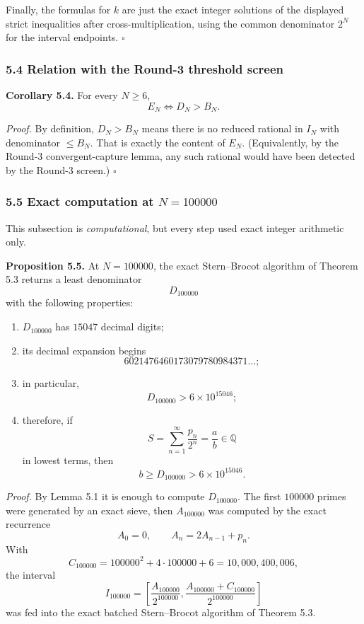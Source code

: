 Finally, the formulas for $k$ are just the exact integer solutions of the displayed strict inequalities after cross-multiplication, using the common denominator $2^N$ for the interval endpoints. \hfill$\square$

\subsubsection*{5.4 Relation with the Round-3 threshold screen}

\textbf{Corollary 5.4.}
For every $N\ge 6$,
\[
E_N \Longleftrightarrow D_N>B_N.
\]

\emph{Proof.}
By definition, $D_N>B_N$ means there is no reduced rational in $I_N$ with denominator $\le B_N$. That is exactly the content of $E_N$. (Equivalently, by the Round-3 convergent-capture lemma, any such rational would have been detected by the Round-3 screen.) \hfill$\square$

\subsubsection*{5.5 Exact computation at $N=100000$}

This subsection is \emph{computational}, but every step used exact integer arithmetic only.

\medskip
\noindent\textbf{Proposition 5.5.}
At $N=100000$, the exact Stern--Brocot algorithm of Theorem 5.3 returns a least denominator
\[
D_{100000}
\]
with the following properties:

\begin{enumerate}
\item $D_{100000}$ has $15047$ decimal digits;
\item its decimal expansion begins
\[
6021476460173079780984371\ldots;
\]
\item in particular,
\[
D_{100000}>6\times 10^{15046};
\]
\item therefore, if
\[
S=\sum_{n=1}^{\infty}\frac{p_n}{2^n}=\frac ab\in\mathbb Q
\]
in lowest terms, then
\[
b\ge D_{100000}>6\times 10^{15046}.
\]
\end{enumerate}

\emph{Proof.}
By Lemma 5.1 it is enough to compute $D_{100000}$. The first $100000$ primes were generated by an exact sieve, then $A_{100000}$ was computed by the exact recurrence
\[
A_0=0,\qquad A_n=2A_{n-1}+p_n.
\]
With
\[
C_{100000}=100000^2+4\cdot 100000+6=10{,}000{,}400{,}006,
\]
the interval
\[
I_{100000}
=
\left[
\frac{A_{100000}}{2^{100000}},
\frac{A_{100000}+C_{100000}}{2^{100000}}
\right]
\]
was fed into the exact batched Stern--Brocot algorithm of Theorem 5.3.

